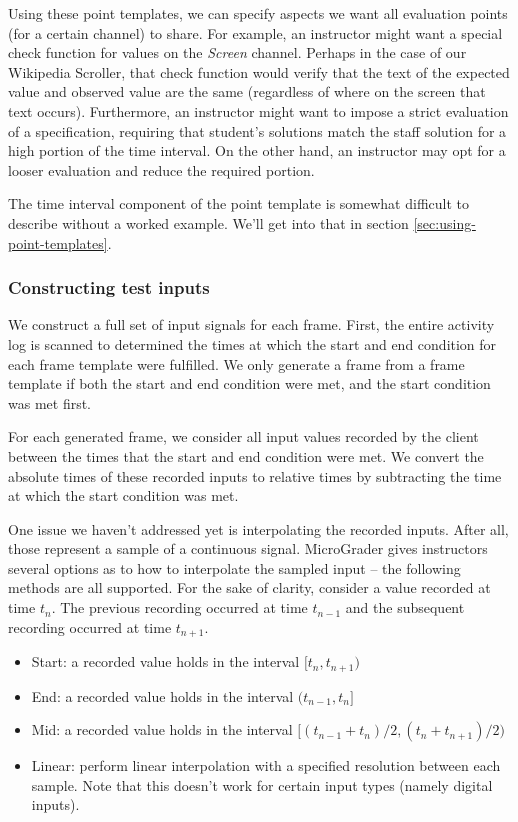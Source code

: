 \documentclass[12pt]{article}
\begin{document}
Using these point templates, we can specify aspects we want all evaluation points (for a certain channel) to share.  For example, an instructor might want a special check function for values on the \textit{Screen} channel.  Perhaps in the case of our Wikipedia Scroller, that check function would verify that the text of the expected value and observed value are the same (regardless of where on the screen that text occurs).  Furthermore, an instructor might want to impose a strict evaluation of a specification, requiring that student's solutions match the staff solution for a high portion of the time interval.  On the other hand, an instructor may opt for a looser evaluation and reduce the required portion.

The time interval component of the point template is somewhat difficult to describe without a worked example.  We'll get into that in section \ref{sec:using-point-templates}.

\subsubsection{Constructing test inputs}
We construct a full set of input signals for each frame. First, the entire activity log is scanned to determined the times at which the start and end condition for each frame template were fulfilled.  We only generate a frame from a frame template if both the start and end condition were met, and the start condition was met first.

For each generated frame, we consider all input values recorded by the client between the times that the start and end condition were met.  We convert the absolute times of these recorded inputs to relative times by subtracting the time at which the start condition was met.

One issue we haven't addressed yet is interpolating the recorded inputs.  After all, those represent a sample of a continuous signal.  MicroGrader gives instructors several options as to how to interpolate the sampled input -- the following methods are all supported.  For the sake of clarity, consider a value recorded at time $t_n$.  The previous recording occurred at time $t_{n-1}$ and the subsequent recording occurred at time $t_{n+1}$.

\begin{itemize}
\item Start: a recorded value holds in the interval $[t_n, t_{n+1})$
\item End: a recorded value holds in the interval $(t_{n-1}, t_n]$
\item Mid: a recorded value holds in the interval $[(t_{n-1} + t_n)/2, (t_n + t_{n+1})/2)$
\item Linear: perform linear interpolation with a specified resolution between each sample.  Note that this doesn't work for certain input types (namely digital inputs).
\end{itemize}
\end{document}
